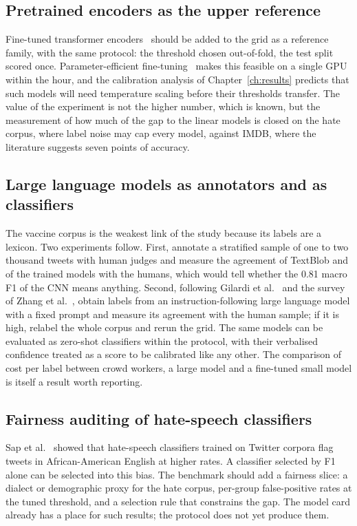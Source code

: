 \subsection{Pretrained encoders as the upper reference}
Fine-tuned transformer encoders~\cite{devlin2019,liu2019} should be added to the grid as a reference family, with the same protocol: the threshold chosen out-of-fold, the test split scored once. Parameter-efficient fine-tuning~\cite{hu2022} makes this feasible on a single GPU within the hour, and the calibration analysis of Chapter~\ref{ch:results} predicts that such models will need temperature scaling before their thresholds transfer. The value of the experiment is not the higher number, which is known, but the measurement of how much of the gap to the linear models is closed on the hate corpus, where label noise may cap every model, against IMDB, where the literature suggests seven points of accuracy.

\subsection{Large language models as annotators and as classifiers}
The vaccine corpus is the weakest link of the study because its labels are a lexicon. Two experiments follow. First, annotate a stratified sample of one to two thousand tweets with human judges and measure the agreement of TextBlob and of the trained models with the humans, which would tell whether the 0.81 macro F1 of the CNN means anything. Second, following Gilardi et al.~\cite{gilardi2023} and the survey of Zhang et al.~\cite{zhang2023}, obtain labels from an instruction-following large language model with a fixed prompt and measure its agreement with the human sample; if it is high, relabel the whole corpus and rerun the grid. The same models can be evaluated as zero-shot classifiers within the protocol, with their verbalised confidence treated as a score to be calibrated like any other. The comparison of cost per label between crowd workers, a large model and a fine-tuned small model is itself a result worth reporting.

\subsection{Fairness auditing of hate-speech classifiers}
Sap et al.~\cite{sap2019} showed that hate-speech classifiers trained on Twitter corpora flag tweets in African-American English at higher rates. A classifier selected by F1 alone can be selected into this bias. The benchmark should add a fairness slice: a dialect or demographic proxy for the hate corpus, per-group false-positive rates at the tuned threshold, and a selection rule that constrains the gap. The model card already has a place for such results; the protocol does not yet produce them.

